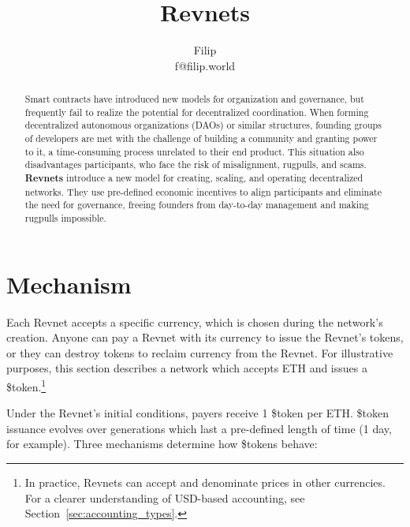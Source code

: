 \documentclass{article}
\title{Revnets}
\author{Filip\\f@filip.world}
\begin{document}
\maketitle

\begin{quote}
\begin{abstract}
  Smart contracts have introduced new models for organization and governance, but frequently fail to realize the potential for decentralized coordination. When forming decentralized autonomous organizations (DAOs) or similar structures, founding groups of developers are met with the challenge of building a community and granting power to it, a time-consuming process unrelated to their end product. This situation also disadvantages participants, who face the risk of misalignment, rugpulls, and scams. \textbf{Revnets} introduce a new model for creating, scaling, and operating decentralized networks. They use pre-defined economic incentives to align participants and eliminate the need for governance, freeing founders from day-to-day management and making rugpulls impossible.
\end{abstract}
\end{quote}

\section{Mechanism}

Each Revnet accepts a specific currency, which is chosen during the network's creation. Anyone can pay a Revnet with its currency to issue the Revnet's tokens, or they can destroy tokens to reclaim currency from the Revnet. For illustrative purposes, this section describes a network which accepts ETH and issues a \$token.\footnote{In practice, Revnets can accept and denominate prices in other currencies. For a clearer understanding of USD-based accounting, see Section~\ref{sec:accounting_types}.}

Under the Revnet's initial conditions, payers receive 1 \$token per ETH. \$token issuance evolves over generations which last a pre-defined length of time (1 day, for example). Three mechanisms determine how \$tokens behave:
\end{document}
